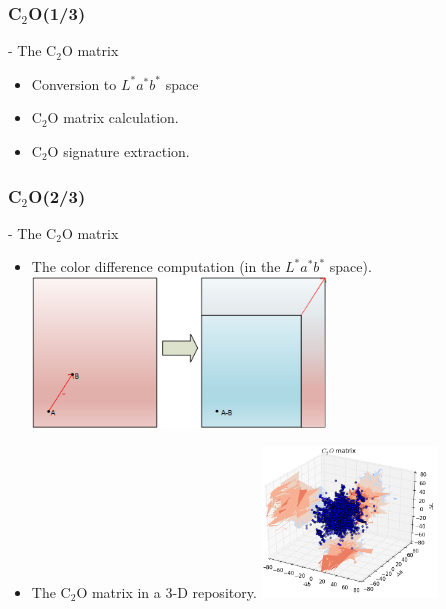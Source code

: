\documentclass[xcolor=table]{beamer}
\begin{document}
\begin{frame}\frametitle{C$_2$O(1/3)}

- The C$_2$O matrix

\begin{itemize}
\item Conversion to $L^* a^* b^*$ space
\item C$_2$O matrix calculation.
\item C$_2$O signature extraction.
\end{itemize}


\end{frame}


\begin{frame}\frametitle{C$_2$O(2/3)}

- The C$_2$O matrix

\begin{itemize}
\item<1-> The color difference computation (in the $L^* a^* b^*$ space).
 {\includegraphics[height=4cm]{ColorDiff.png}} %
\item<2-> The C$_2$O matrix in a 3-D repository.
 {\includegraphics[height=4cm]{C2OMatrix.png}}
\end{itemize}


\end{frame}
\end{document}
